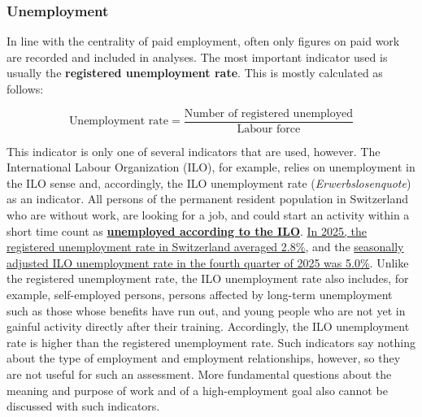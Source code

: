 \documentclass[
  british,
  a4paper,
  DIV=11,
  numbers=noendperiod,
  oneside,
  openany]{scrreprt}
\begin{document}
\subsubsection{Unemployment}\label{unemployment}

In line with the centrality of paid employment, often only figures on
paid work are recorded and included in analyses. The most important
indicator used is usually the \textbf{registered unemployment rate}.
This is mostly calculated as follows:

\[\text{Unemployment rate} = \frac{\text{Number of registered unemployed}}{\text{Labour force}}\]

This indicator is only one of several indicators that are used, however.
The International Labour Organization (ILO), for example, relies on
unemployment in the ILO sense and, accordingly, the ILO unemployment
rate (\emph{Erwerbslosenquote}) as an indicator. All persons of the
permanent resident population in Switzerland who are without work, are
looking for a job, and could start an activity within a short time count
as
\href{https://www.bfs.admin.ch/bfs/en/home/statistics/work-income/surveys/els-ilo.html}{\textbf{unemployed
according to the ILO}}.
\href{https://www.admin.ch/de/newnsb/yFqP7XwYSs3ODBR8ZdR9g}{In 2025, the
registered unemployment rate in Switzerland averaged 2.8\%}, and the
\href{https://www.bfs.admin.ch/bfs/en/home/statistics/catalogues-databases.assetdetail.36326601.html}{seasonally
adjusted ILO unemployment rate in the fourth quarter of 2025 was 5.0\%}.
Unlike the registered unemployment rate, the ILO unemployment rate also
includes, for example, self-employed persons, persons affected by
long-term unemployment such as those whose benefits have run out, and
young people who are not yet in gainful activity directly after their
training. Accordingly, the ILO unemployment rate is higher than the
registered unemployment rate. Such indicators say nothing about the type
of employment and employment relationships, however, so they are not
useful for such an assessment. More fundamental questions about the
meaning and purpose of work and of a high-employment goal also cannot be
discussed with such indicators.
\end{document}
